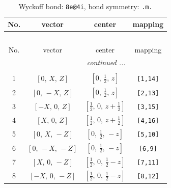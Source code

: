 \documentclass[fleqn,8pt]{jsarticle}
\begin{document}
\begin{longtable}{cccc}
\caption{Wyckoff bond: {\tt 8e@4i}, bond symmetry: {\tt .m.}}
 \\
 \hline \hline
No. & vector & center & mapping \\ \hline \endfirsthead

\multicolumn{3}{l}{\tablename\ \thetable{}} \\
 \hline \hline
No. & vector & center & mapping \\ \hline \endhead

 \hline \hline
\multicolumn{3}{r}{\footnotesize\it continued ...} \\ \endfoot

 \hline \hline
\multicolumn{3}{r}{} \\ \endlastfoot

1 & $\left[ 0,\, X,\, Z \right]$ & $\left[ 0,\, \frac{1}{2},\, z \right]$ & {\tt [1,14]} \\ \hline
2 & $\left[ 0,\, - X,\, Z \right]$ & $\left[ 0,\, \frac{1}{2},\, z \right]$ & {\tt [2,13]} \\ \hline
3 & $\left[ - X,\, 0,\, Z \right]$ & $\left[ \frac{1}{2},\, 0,\, z + \frac{1}{2} \right]$ & {\tt [3,15]} \\ \hline
4 & $\left[ X,\, 0,\, Z \right]$ & $\left[ \frac{1}{2},\, 0,\, z + \frac{1}{2} \right]$ & {\tt [4,16]} \\ \hline
5 & $\left[ 0,\, X,\, - Z \right]$ & $\left[ 0,\, \frac{1}{2},\, - z \right]$ & {\tt [5,10]} \\ \hline
6 & $\left[ 0,\, - X,\, - Z \right]$ & $\left[ 0,\, \frac{1}{2},\, - z \right]$ & {\tt [6,9]} \\ \hline
7 & $\left[ X,\, 0,\, - Z \right]$ & $\left[ \frac{1}{2},\, 0,\, \frac{1}{2} - z \right]$ & {\tt [7,11]} \\ \hline
8 & $\left[ - X,\, 0,\, - Z \right]$ & $\left[ \frac{1}{2},\, 0,\, \frac{1}{2} - z \right]$ & {\tt [8,12]} \\
\end{longtable}
\renewcommand{\arraystretch}{1.2}
\end{document}
